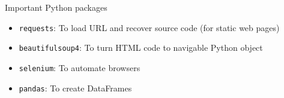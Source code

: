 \begin{frame}{Important Python packages}
\begin{itemize}
	\item {\tt requests}: To load URL and recover source code (for static web pages)
	\item {\tt beautifulsoup4}: To turn HTML code to navigable Python object
	\item {\tt selenium}: To automate browsers
	\item {\tt pandas}: To create DataFrames
\end{itemize}

\end{frame}